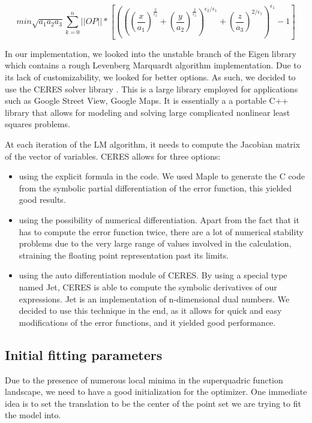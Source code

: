 \documentclass{article}
\begin{document}
\begin{equation}
min \sqrt {a_1 a_2 a_3} \sum_{k=0}^n ||OP|| * \left[ \left( \left( \left( \frac{x}{a_1}\right)^{\frac{2}{\epsilon_2}} + \left( \frac{y}{a_2} \right) ^{\frac{2}{\epsilon_2}} \right)^{\epsilon_2 / \epsilon_1} + \left( \frac{z}{a_3} \right) ^{2/\epsilon_1} \right) ^{\epsilon_1} - 1 \right]
\end{equation}


In our implementation, we looked into the unstable branch of the Eigen library \cite{eigenweb} which contains a rough Levenberg Marquardt algorithm implementation. Due to its lack of customizability, we looked for better options. As such, we decided to use the CERES solver library \cite{ceres-solver}. This is a large library employed for applications such as Google Street View, Google Maps. It is essentially a a portable C++ library that allows for modeling and solving large complicated nonlinear least squares problems.

At each iteration of the LM algorithm, it needs to compute the Jacobian matrix of the vector of variables. CERES allows for three options:

\begin{itemize}
	\item {using the explicit formula in the code. We used Maple to generate the C code from the symbolic partial differentiation of the error function, this yielded good results.}
	\item {using the possibility of numerical differentiation. Apart from the fact that it has to compute the error function twice, there are a lot of numerical stability problems due to the very large range of values involved in the calculation, straining the floating point representation past its limits.}
	\item {using the auto differentiation module of CERES. By using a special type named Jet, CERES is able to compute the symbolic derivatives of our expressions. Jet is an implementation of n-dimensional dual numbers. We decided to use this technique in the end, as it allows for quick and easy modifications of the error functions, and it yielded good performance.}
\end{itemize}

\subsection*{Initial fitting parameters}

Due to the presence of numerous local minima in the superquadric function landscape, we need to have a good initialization for the optimizer. One immediate idea is to set the translation to be the center of the point set we are trying to fit the model into.
\end{document}
